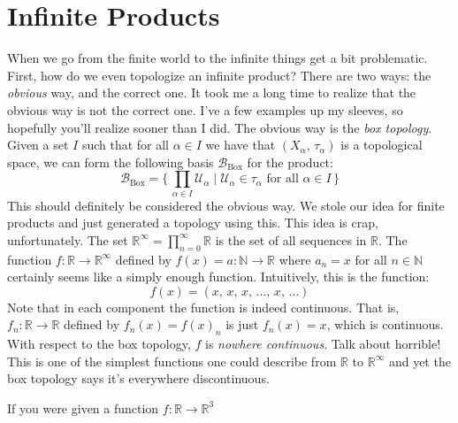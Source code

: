 \documentclass{article}
\theoremstyle{plain}
\theoremstyle{normal}
\begin{document}
    \section{Infinite Products}
        When we go from the finite world to the infinite things get a bit
        problematic. First, how do we even topologize an infinite product?
        There are two ways: the \textit{obvious} way, and the correct one.
        It took me a long time to realize that the obvious way is not the
        correct one. I've a few examples up my sleeves, so hopefully you'll
        realize sooner than I did. The obvious way is the
        \textit{box topology}. Given a set $I$ such that for all
        $\alpha\in{I}$ we have that $(X_{\alpha},\,\tau_{\alpha})$ is a
        topological space, we can form the following basis
        $\mathcal{B}_{\textrm{Box}}$ for the product:
        \begin{equation}
            \mathcal{B}_{\textrm{Box}}
            =\Big\{\,\prod_{\alpha\in{I}}\mathcal{U}_{\alpha}\;|\;
                \mathcal{U}_{\alpha}\in\tau_{\alpha}
                \textrm{ for all }\alpha\in{I}\,\Big\}
        \end{equation}
        This should definitely be considered the obvious way. We stole our
        idea for finite products and just generated a topology using this.
        This idea is crap, unfortunately. The set
        $\mathbb{R}^{\infty}=\prod_{n=0}^{\infty}\mathbb{R}$ is the set of
        all sequences in $\mathbb{R}$. The function
        $f:\mathbb{R}\rightarrow\mathbb{R}^{\infty}$ defined by
        $f(x)=a:\mathbb{N}\rightarrow\mathbb{R}$ where $a_{n}=x$ for all
        $n\in\mathbb{N}$ certainly seems like a simply enough function.
        Intuitively, this is the function:
        \begin{equation}
            f(x)=(x,\,x,\,x,\,\dots,\,x,\,\dots)
        \end{equation}
        Note that in each component the function is indeed continuous.
        That is, $f_{n}:\mathbb{R}\rightarrow\mathbb{R}$ defined by
        $f_{n}(x)=f(x)_{n}$ is just $f_{n}(x)=x$, which is continuous.
        With respect to the box topology, $f$ is \textit{nowhere continuous}.
        Talk about horrible! This is one of the simplest functions one could
        describe from $\mathbb{R}$ to $\mathbb{R}^{\infty}$ and yet the
        box topology says it's everywhere discontinuous.
        \par\hfill\par
        If you were given a function $f:\mathbb{R}\rightarrow\mathbb{R}^{3}$
\end{document}
